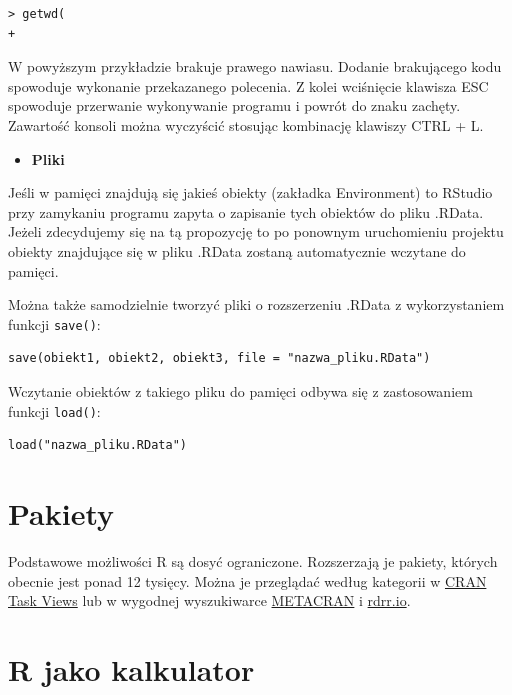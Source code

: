\documentclass[
  letterpaper,
  DIV=11,
  numbers=noendperiod]{scrreprt}
\providecommand{\tightlist}{%
  \setlength{\itemsep}{0pt}\setlength{\parskip}{0pt}}\usepackage{longtable,booktabs,array}
\begin{document}
\begin{verbatim}
> getwd(
+ 
\end{verbatim}

W powyższym przykładzie brakuje prawego nawiasu. Dodanie brakującego
kodu spowoduje wykonanie przekazanego polecenia. Z kolei wciśnięcie
klawisza ESC spowoduje przerwanie wykonywanie programu i powrót do znaku
zachęty. Zawartość konsoli można wyczyścić stosując kombinację klawiszy
CTRL + L.

\begin{itemize}
\tightlist
\item
  \textbf{Pliki }
\end{itemize}

Jeśli w pamięci znajdują się jakieś obiekty (zakładka Environment) to
RStudio przy zamykaniu programu zapyta o zapisanie tych obiektów do
pliku .RData. Jeżeli zdecydujemy się na tą propozycję to po ponownym
uruchomieniu projektu obiekty znajdujące się w pliku .RData zostaną
automatycznie wczytane do pamięci.

Można także samodzielnie tworzyć pliki o rozszerzeniu .RData z
wykorzystaniem funkcji \texttt{save()}:

\begin{verbatim}
save(obiekt1, obiekt2, obiekt3, file = "nazwa_pliku.RData")
\end{verbatim}

Wczytanie obiektów z takiego pliku do pamięci odbywa się z zastosowaniem
funkcji \texttt{load()}:

\begin{verbatim}
load("nazwa_pliku.RData")
\end{verbatim}

\hypertarget{pakiety}{%
\section{Pakiety}\label{pakiety}}

Podstawowe możliwości R są dosyć ograniczone. Rozszerzają je pakiety,
których obecnie jest ponad 12 tysięcy. Można je przeglądać według
kategorii w \href{https://cran.r-project.org/web/views/}{CRAN Task
Views} lub w wygodnej wyszukiwarce
\href{https://www.r-pkg.org/}{METACRAN} i
\href{https://rdrr.io/}{rdrr.io}.

\hypertarget{r-jako-kalkulator}{%
\section{R jako kalkulator}\label{r-jako-kalkulator}}
\end{document}
